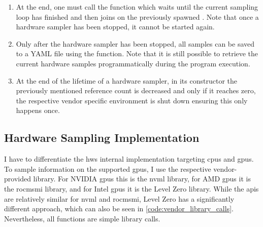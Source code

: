 \begin{enumerate}
    \item%
    At the end, one must call the  function which waits until the current sampling loop has finished and then joins on the previously spawned . 
    Note that once a hardware sampler has been stopped, it cannot be started again. 
    \item%
    Only after the hardware sampler has been stopped, all samples can be saved to a YAML file using the  function. 
    Note that it is still possible to retrieve the current hardware samples programmatically during the program execution.
    \item%
    At the end of the lifetime of a hardware sampler, in its constructor the previously mentioned reference count is decreased and only if it reaches zero, the respective vendor specific environment is shut down ensuring this only happens once. 
\end{enumerate}

\subsection{Hardware Sampling Implementation}

I have to differentiate the hws internal implementation targeting \glspl{cpu} and \glspl{gpu}.
To sample information on the supported \glspl{gpu}, I use the respective vendor-provided library. 
For NVIDIA \glspl{gpu} this is the \gls{nvml} library, for AMD \glspl{gpu} it is the \gls{rocmsmi} library, and for Intel \glspl{gpu} it is the Level Zero library. 
While the \glspl{api} are relatively similar for \gls{nvml} and \gls{rocmsmi}, Level Zero has a significantly different approach, which can also be seen in \autoref{code:vendor_library_calls}. 
Nevertheless, all functions are simple library calls.

